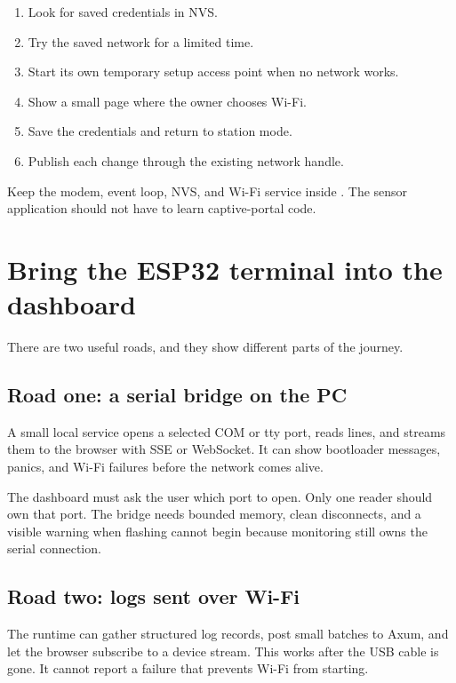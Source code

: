 \begin{enumerate}
  \item Look for saved credentials in NVS.
  \item Try the saved network for a limited time.
  \item Start its own temporary setup access point when no network works.
  \item Show a small page where the owner chooses Wi-Fi.
  \item Save the credentials and return to station mode.
  \item Publish each change through the existing network handle.
\end{enumerate}

Keep the modem, event loop, NVS, and Wi-Fi service inside . The sensor application should not have to learn captive-portal code.

\section{Bring the ESP32 terminal into the dashboard}

There are two useful roads, and they show different parts of the journey.

\subsection{Road one: a serial bridge on the PC}

A small local service opens a selected COM or tty port, reads lines, and streams them to the browser with SSE or WebSocket. It can show bootloader messages, panics, and Wi-Fi failures before the network comes alive.

The dashboard must ask the user which port to open. Only one reader should own that port. The bridge needs bounded memory, clean disconnects, and a visible warning when flashing cannot begin because monitoring still owns the serial connection.

\subsection{Road two: logs sent over Wi-Fi}

The runtime can gather structured log records, post small batches to Axum, and let the browser subscribe to a device stream. This works after the USB cable is gone. It cannot report a failure that prevents Wi-Fi from starting.

